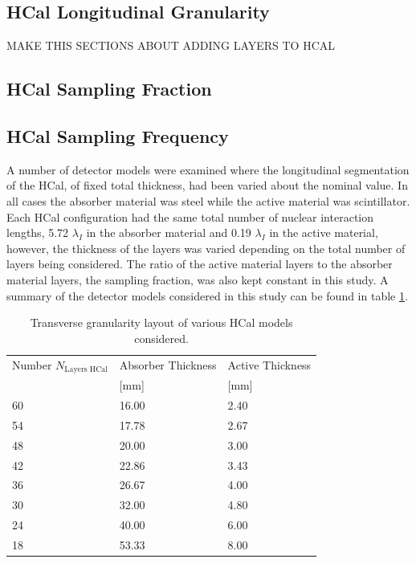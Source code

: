 
\subsection{HCal Longitudinal Granularity}
\label{sec:hcalnlayers}

MAKE THIS SECTIONS ABOUT ADDING LAYERS TO HCAL


\subsection{HCal Sampling Fraction}
\label{sec:hcalsamplingfraction}



\subsection{HCal Sampling Frequency}
\label{sec:hcalsamplingfrequency}
A number of detector models were examined where the longitudinal segmentation of the HCal, of fixed total thickness, had been varied about the nominal value.  In all cases the absorber material was steel while the active material was scintillator.  Each HCal configuration had the same total number of nuclear interaction lengths, 5.72 $\lambda_{I}$ in the absorber material and 0.19 $\lambda_{I}$ in the active material, however, the thickness of the layers was varied depending on the total number of layers being considered.  The ratio of the active material layers to the absorber material layers, the sampling fraction, was also kept constant in this study.  A summary of the detector models considered in this study can be found in table \ref{table:nlayershcaloption}.  

\begin{table}[h!]
\centering
\begin{tabular}{ l l l }
\hline
Number $N_{\text{Layers HCal}}$& Absorber Thickness & Active Thickness \\
 & [mm] & [mm] \\
\hline
60 & 16.00 & 2.40 \\ 
54 & 17.78 & 2.67 \\
48 & 20.00 & 3.00 \\
42 & 22.86 & 3.43 \\
36 & 26.67 & 4.00 \\
30 & 32.00 & 4.80 \\
24 & 40.00 & 6.00 \\
18 & 53.33 & 8.00 \\
\hline
\end{tabular}
\caption[Transverse granularity layout of various HCal models considered.]{Transverse granularity layout of various HCal models considered.}
\label{table:nlayershcaloption}
\end{table}

